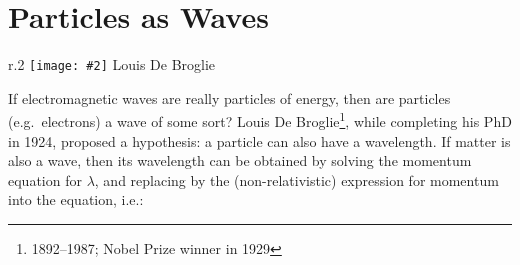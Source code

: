 \documentclass[11pt]{article}
\newcommand{\pic}[2]{\texttt{[image: \#2]}}
\begin{document}
%
%
%
%
%
%
%

\section{Particles as Waves}

\begin{wrapfigure}{r}{.2\textwidth}
  \centering
  \pic{.2}{76562-004-66881FD5.jpg}
  Louis De Broglie
\end{wrapfigure}
If electromagnetic waves are really particles of energy, then are particles
(e.g.\ electrons) a wave of some sort? Louis De
Broglie\footnote{1892--1987; Nobel Prize winner in 1929}, while completing his
PhD in 1924, proposed a hypothesis: a particle can also have a wavelength.
%
%
%
%
%
%
%  
%
%  
%
%
%
%
%
If matter is also a wave, then its wavelength can be obtained by solving the
momentum equation for $\lambda$, and replacing by the (non-relativistic)
expression for momentum into the equation, i.e.:
\end{document}
